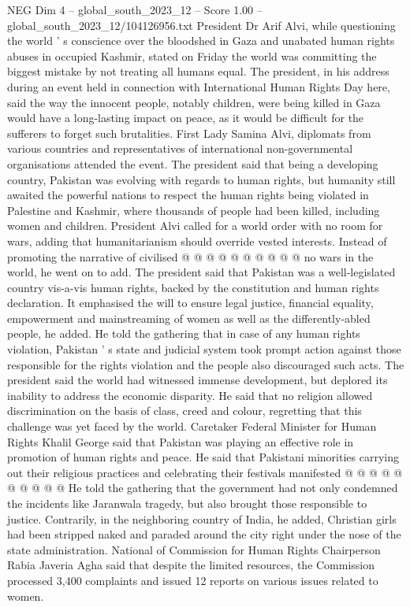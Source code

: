 \begin{textsample}{NEG Dim 4 – global\_south\_2023\_12 – Score 1.00 – global\_south\_2023\_12/104126956.txt}  \label{ex:f4_neg_320}
President Dr Arif Alvi, while questioning the world ' s conscience over the bloodshed in Gaza and unabated human rights abuses in occupied Kashmir, stated on Friday the world was committing the biggest mistake by not treating all humans equal.
The president, in his address during an event held in connection with International Human Rights Day here, said the way the innocent people, notably children, were being killed in Gaza would have a long-lasting impact on peace, as it would be difficult for the sufferers to forget such brutalities.
First Lady Samina Alvi, diplomats from various countries and representatives of international non-governmental organisations attended the event.
The president said that being a developing country, Pakistan was evolving with regards to human rights, but humanity still awaited the powerful nations to respect the human rights being violated in Palestine and Kashmir, where thousands of people had been killed, including women and children.
President Alvi called for a world order with no room for wars, adding that humanitarianism should override vested interests.
Instead of promoting the narrative of civilised @ @ @ @ @ @ @ @ @ @ no wars in the world, he went on to add.
The president said that Pakistan was a well-legislated country vis-a-vis human rights, backed by the constitution and human rights declaration.
It emphasised the will to ensure legal justice, financial equality, empowerment and mainstreaming of women as well as the differently-abled people, he added.
He told the gathering that in case of any human rights violation, Pakistan ' s state and judicial system took prompt action against those responsible for the rights violation and the people also discouraged such acts.
The president said the world had witnessed immense development, but deplored its inability to address the economic disparity.
He said that no religion allowed discrimination on the basis of class, creed and colour, regretting that this challenge was yet faced by the world.
Caretaker Federal Minister for Human Rights Khalil George said that Pakistan was playing an effective role in promotion of human rights and peace.
He said that Pakistani minorities carrying out their religious practices and celebrating their festivals manifested @ @ @ @ @ @ @ @ @ @ He told the gathering that the government had not only condemned the incidents like Jaranwala tragedy, but also brought those responsible to justice.
Contrarily, in the neighboring country of India, he added, Christian girls had been stripped naked and paraded around the city right under the nose of the state administration.
National of Commission for Human Rights Chairperson Rabia Javeria Agha said that despite the limited resources, the Commission processed 3,400 complaints and issued 12 reports on various issues related to women.

\end{textsample}
